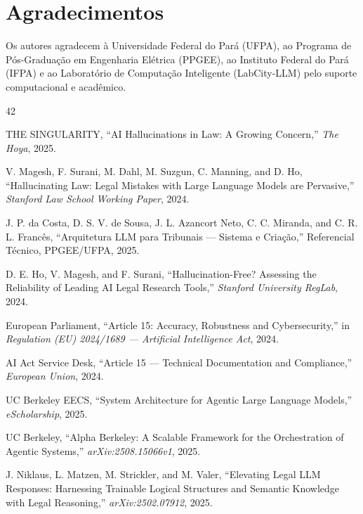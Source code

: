 \documentclass[journal,10pt]{IEEEtran}
\begin{document}
\section*{Agradecimentos}

Os autores agradecem \`{a} Universidade Federal do Par\'{a} (UFPA), ao Programa de P\'{o}s-Gradua\c{c}\~{a}o em Engenharia El\'{e}trica (PPGEE), ao Instituto Federal do Par\'{a} (IFPA) e ao Laborat\'{o}rio de Computa\c{c}\~{a}o Inteligente (LabCity-LLM) pelo suporte computacional e acad\^{e}mico.

\begin{thebibliography}{42}

THE SINGULARITY, ``AI Hallucinations in Law: A Growing Concern,'' \textit{The Hoya}, 2025.

V. Magesh, F. Surani, M. Dahl, M. Suzgun, C. Manning, and D. Ho, ``Hallucinating Law: Legal Mistakes with Large Language Models are Pervasive,'' \textit{Stanford Law School Working Paper}, 2024.

J. P. da Costa, D. S. V. de Sousa, J. L. Azancort Neto, C. C. Miranda, and C. R. L. Franc\^{e}s, ``Arquitetura LLM para Tribunais --- Sistema e Cria\c{c}\~{a}o,'' Referencial T\'{e}cnico, PPGEE/UFPA, 2025.

D. E. Ho, V. Magesh, and F. Surani, ``Hallucination-Free? Assessing the Reliability of Leading AI Legal Research Tools,'' \textit{Stanford University RegLab}, 2024.

European Parliament, ``Article 15: Accuracy, Robustness and Cybersecurity,'' in \textit{Regulation (EU) 2024/1689 --- Artificial Intelligence Act}, 2024.

AI Act Service Desk, ``Article 15 --- Technical Documentation and Compliance,'' \textit{European Union}, 2024.

UC Berkeley EECS, ``System Architecture for Agentic Large Language Models,'' \textit{eScholarship}, 2025.

UC Berkeley, ``Alpha Berkeley: A Scalable Framework for the Orchestration of Agentic Systems,'' \textit{arXiv:2508.15066v1}, 2025.

J. Niklaus, L. Matzen, M. Strickler, and M. Valer, ``Elevating Legal LLM Responses: Harnessing Trainable Logical Structures and Semantic Knowledge with Legal Reasoning,'' \textit{arXiv:2502.07912}, 2025.


\end{thebibliography}
\end{document}
